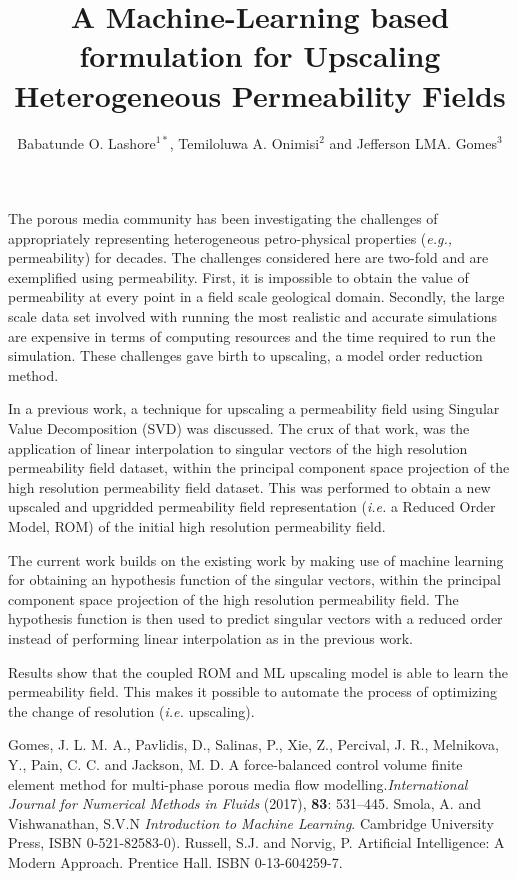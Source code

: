 \documentclass[a4paper]{wccm2020-abstract}
\title{A Machine-Learning based formulation for Upscaling Heterogeneous Permeability Fields}
\author{Babatunde O. Lashore$^{1*}$, Temiloluwa A. Onimisi$^{2}$ and Jefferson LMA. Gomes$^{3}$}
\newcommand{\eg}{{\it e.g., }}
\begin{document}
\thispagestyle{empty}

The porous media community has been investigating the challenges of appropriately representing heterogeneous petro-physical properties (\eg permeability) for decades. The challenges considered here are two-fold and are exemplified using permeability. First, it is impossible to obtain the value of permeability at every point in a field scale geological domain. Secondly, the large scale data set involved with running the most realistic and accurate simulations are expensive in terms of computing resources and the time required to run the simulation. These challenges gave birth to upscaling, a model order reduction method.

In a previous work, a technique for upscaling a permeability field using Singular Value Decomposition (SVD) was discussed. The crux of that work, was the application of linear interpolation to singular vectors of the high resolution permeability field dataset, within the principal component space projection of the high resolution permeability field dataset. This was performed to obtain a new upscaled and upgridded permeability field representation ({\it i.e.} a Reduced Order Model, ROM) of the initial high resolution permeability field.

The current work builds on the existing work by making use of machine learning \cite{Smola_2008, Russell_2009} for obtaining an hypothesis function of the singular vectors, within the principal component space projection of the high resolution permeability field. The hypothesis function is then used to predict singular vectors with a reduced order instead of performing linear interpolation as in the previous work. 

Results show that the coupled ROM and ML upscaling model is able to learn the permeability field. This makes it possible to  automate the process of optimizing the change of resolution ({\it i.e.} upscaling). 

\begin{thebibliography}{99}
 Gomes, J. L. M. A., Pavlidis, D., Salinas, P., Xie, Z., Percival, J. R., Melnikova, Y., Pain, C. C. and Jackson, M. D. A force-balanced control volume finite element method for multi-phase porous media flow modelling.\textit{International Journal for Numerical Methods in Fluids} (2017), \textbf{83}: 531--445.
 Smola, A. and Vishwanathan, S.V.N \textit{Introduction to Machine Learning}. Cambridge University Press,
 ISBN 0-521-82583-0).
 Russell, S.J. and Norvig, P. Artificial Intelligence: A Modern Approach. Prentice Hall.
ISBN 0-13-604259-7.
\end{thebibliography}
\end{document}
